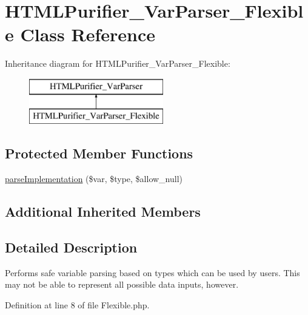\hypertarget{classHTMLPurifier__VarParser__Flexible}{\section{H\+T\+M\+L\+Purifier\+\_\+\+Var\+Parser\+\_\+\+Flexible Class Reference}
\label{classHTMLPurifier__VarParser__Flexible}
}
Inheritance diagram for H\+T\+M\+L\+Purifier\+\_\+\+Var\+Parser\+\_\+\+Flexible\+:\begin{figure}[H]
\begin{center}
\leavevmode
\includegraphics[height=2.000000cm]{classHTMLPurifier__VarParser__Flexible}
\end{center}
\end{figure}
\subsection*{Protected Member Functions}
\begin{DoxyCompactItemize}
\item 
\hyperlink{classHTMLPurifier__VarParser__Flexible_ad9e0a6265e92c69f3fe31ca3edcfd817}{parse\+Implementation} (\$var, \$type, \$allow\+\_\+null)
\end{DoxyCompactItemize}
\subsection*{Additional Inherited Members}


\subsection{Detailed Description}
Performs safe variable parsing based on types which can be used by users. This may not be able to represent all possible data inputs, however. 

Definition at line 8 of file Flexible.\+php.



